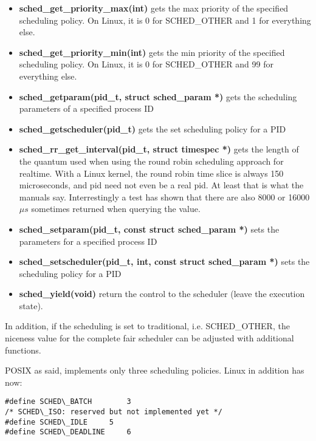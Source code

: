 \documentclass[]{scrartcl}
\begin{document}
\begin{itemize}
	\item \textbf{sched\_get\_priority\_max(int)}
		gets the max priority of the specified scheduling policy. On Linux, it is 0 for SCHED\_OTHER and 1 for everything else. 
	
	\item \textbf{sched\_get\_priority\_min(int)}
		gets the min priority of the specified scheduling policy. On Linux, it is 0 for SCHED\_OTHER and 99 for everything else. 
		
	\item \textbf{sched\_getparam(pid\_t, struct sched\_param *)}
		gets the scheduling parameters of a specified process ID
	
	\item \textbf{sched\_getscheduler(pid\_t)}
		gets the set scheduling policy for a PID
	
	\item \textbf{sched\_rr\_get\_interval(pid\_t, struct timespec *)}
		gets the length of the quantum used when using the round robin scheduling approach for realtime.
		With a Linux kernel, the round robin time slice is always 150 microseconds, and pid need not even be a real pid. At least that is what the manuals say. Interrestingly a test has shown that there are also 8000 or 16000 $\mu s$ sometimes returned when querying the value.
	
	\item \textbf{sched\_setparam(pid\_t, const struct sched\_param *)}
		sets the parameters for a specified process ID
	
	\item \textbf{sched\_setscheduler(pid\_t, int, const struct sched\_param *)}
		sets the scheduling policy for a PID
	
	\item \textbf{sched\_yield(void)}
		return the control to the scheduler (leave the execution state).
\end{itemize}

In addition, if the scheduling is set to traditional, i.e. SCHED\_OTHER, the niceness value for the complete fair scheduler can be adjusted with additional functions. 

POSIX as said, implements only three scheduling policies.
Linux in addition has now:

\begin{verbatim}
#define SCHED\_BATCH		3
/* SCHED\_ISO: reserved but not implemented yet */
#define SCHED\_IDLE		5
#define SCHED\_DEADLINE		6
\end{verbatim}
\end{document}
